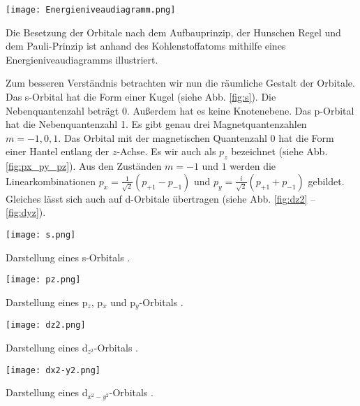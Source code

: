 \begin{dsafigure}
 \centering
 \texttt{[image: Energieniveaudiagramm.png]}
 \caption{Die Besetzung der Orbitale nach dem Aufbauprinzip, der Hunschen Regel und dem Pauli-Prinzip ist anhand des Kohlenstoffatoms mithilfe eines Energieniveaudiagramms illustriert.}
 \label{fig:Energieniveaudiagramm}
\end{dsafigure}

Zum besseren Verständnis betrachten wir nun die räumliche Gestalt der Orbitale.
Das s-Orbital hat die Form einer Kugel (siehe Abb. \ref{fig:s}).
Die Nebenquantenzahl beträgt $0$. Außerdem hat es keine Knotenebene. Das
p-Orbital hat die Nebenquantenzahl 1. Es gibt genau drei Magnetquantenzahlen
$m = -1, 0, 1$. Das Orbital mit der magnetischen Quantenzahl $0$ hat die Form
einer Hantel entlang der $z$-Achse. Es wir auch als $p_{z}$ bezeichnet
(siehe Abb. \ref{fig:px_py_pz}). Aus den Zuständen $m = -1$ und $1$ werden
die Linearkombinationen $p_{x} = \frac{1}{\sqrt{2}} (p_{+1} - p_{-1})$
und $p_{y} = \frac{i}{\sqrt{2}}(p_{+1}+p_{-1})$
gebildet. Gleiches lässt sich auch auf
d-Orbitale übertragen (siehe Abb. \ref{fig:dz2} -- \ref{fig:dyz}).

\begin{dsafigure}
 \centering
 \texttt{[image: s.png]}
 \caption{Darstellung eines s-Orbitals \cite{ADF2017authors}.}
 \label{fig:s}
\end{dsafigure}

\begin{dsafigure}
 \centering
 \texttt{[image: pz.png]}
 \caption{Darstellung eines p$_{z}$, p$_{x}$ und p$_{y}$-Orbitals \cite{ADF2017authors}.}
 \label{fig:px_py_pz}
\end{dsafigure}

\begin{dsafigure}
 \centering
 \texttt{[image: dz2.png]}
 \caption{Darstellung eines d$_{z^{2}}$-Orbitals \cite{ADF2017authors}.}
 \label{fig:dz2}
\end{dsafigure}

\begin{dsafigure}
 \centering
 \texttt{[image: dx2-y2.png]}
 \caption{Darstellung eines d$_{x^{2}-y^{2}}$-Orbitals \cite{ADF2017authors}.}
 \label{fig:dx2-y2}
\end{dsafigure}

